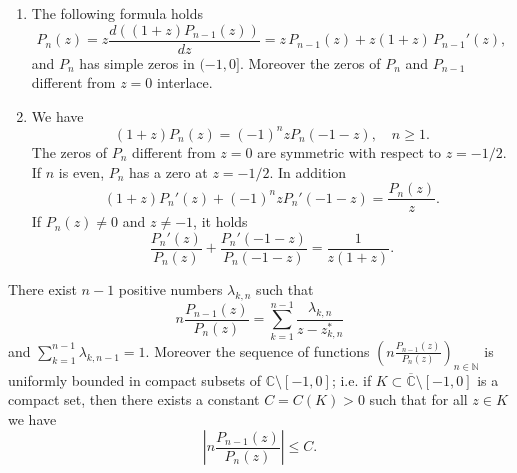 \documentclass[10pt,a4paper]{amsart}
\begin{document}
\begin{lemma}\label{lemZer} 
\begin{enumerate}
\item
The following formula holds
\begin{equation}
\label{delDifEc}
P_n(z)=z\frac{d((1+z)P_{n-1}(z))}{dz}=z\,P_{n-1}(z)+z(1+z)\,P_{n-1}'(z),
\end{equation}
and $P_n$ has simple zeros in $(-1,0]$. Moreover the zeros of $P_n$ and $P_{n-1}$  different from $z=0$ interlace.

\item We have
\begin{equation}
\label{simtRel}
(1+z)P_n(z)=(-1)^nzP_n(-1-z),\quad n\ge 1.
\end{equation}
The zeros of $P_n$ different from $z=0$ are symmetric with respect to $z=-1/2$. If $n$ is even, $P_n$ has  a zero at $z=-1/2$. In addition
\begin{equation}
\label{RelPolDer}
(1+z)P_n'(z)+(-1)^nzP_n'(-1-z)=\frac{P_n(z)}{z}.	
\end{equation}
If $P_n(z)\ne 0$ and $z\ne -1$, it holds
\begin{equation}
\label{RelPolDer2}
\frac{P_n'(z)}{P_n(z)}+\frac{P_n'(-1-z)}{P_n(-1-z)}=\frac{1}{z(1+z)}.
\end{equation}
\end{enumerate}
\end{lemma}

\begin{lemma}\label{LemCocienteCons} There exist $n-1$ positive numbers $\lambda_{k,n}$ such that 
\begin{equation}
\label{descFracSimples}
n\frac{P_{n-1}(z)}{P_n(z)}=\sum_{k=1}^{n-1}\frac{\lambda_{k,n}}{z-z_{k,n}^*}
\end{equation}
and $\sum_{k=1}^{n-1}\lambda_{k,n-1}=1$. Moreover the sequence of functions $\left(n\frac{P_{n-1}(z)}{P_n(z)}\right)_{n\in\mathbb{N}}$ is uniformly bounded in compact subsets of  $\mathbb{C}\setminus[-1,0]$; i.e. if $K\subset \overline{\mathbb{C}}\setminus[-1,0]$ is a compact set, then there exists a constant $C=C(K)>0$ such that for all  $z\in K$ we have
\[
\left|n\frac{P_{n-1}(z)}{P_n(z)}\right|\le C.
\]

\end{lemma}
\end{document}
